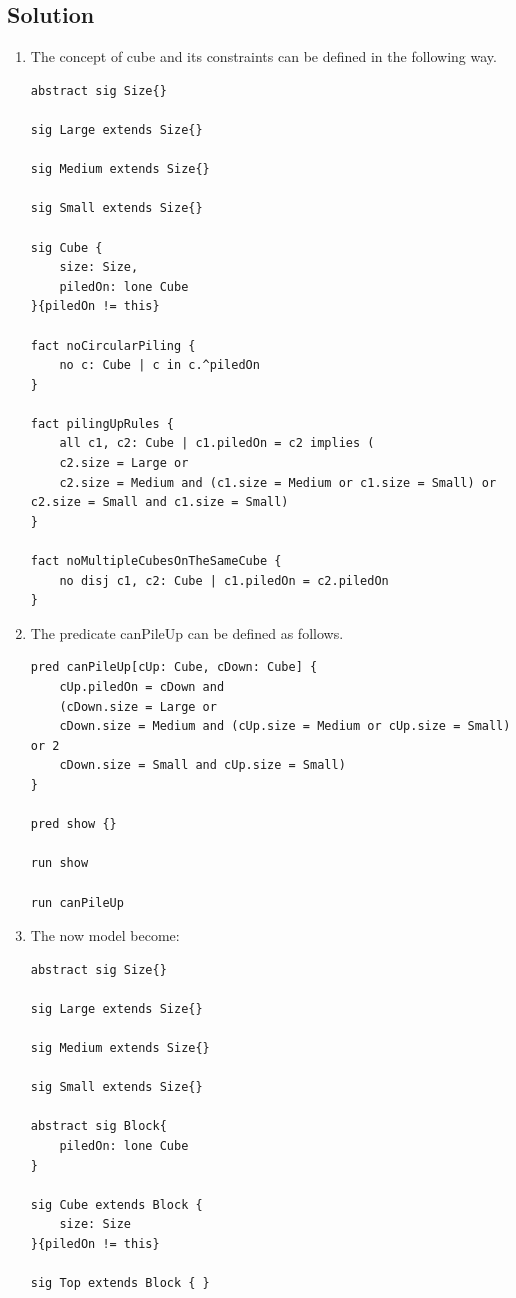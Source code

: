 \documentclass[12pt, a4paper]{report}
\newtheorem[style=M,bodystyle=\normalfont]{theorem}{Theorem}
\newtheorem[style=M,bodystyle=\normalfont]{corollary}{Corollary}
\newtheorem[style=M,bodystyle=\normalfont]{lemma}{Lemma}
\newtheorem[style=M,bodystyle=\normalfont]{definition}{Definition}
\begin{document}
    \subsection*{Solution}
    \begin{enumerate}
        \item The concept of cube and its constraints can be defined in the following way. 
            \begin{lstlisting}[language=alloy]
abstract sig Size{}

sig Large extends Size{} 

sig Medium extends Size{} 

sig Small extends Size{}

sig Cube {
    size: Size,
    piledOn: lone Cube
}{piledOn != this}

fact noCircularPiling {
    no c: Cube | c in c.^piledOn
}

fact pilingUpRules {
    all c1, c2: Cube | c1.piledOn = c2 implies (
    c2.size = Large or
    c2.size = Medium and (c1.size = Medium or c1.size = Small) or c2.size = Small and c1.size = Small)
}

fact noMultipleCubesOnTheSameCube {
    no disj c1, c2: Cube | c1.piledOn = c2.piledOn
}
            \end{lstlisting}
        \item The predicate canPileUp can be defined as follows. 
            \begin{lstlisting}[language=alloy]
pred canPileUp[cUp: Cube, cDown: Cube] {
    cUp.piledOn = cDown and
    (cDown.size = Large or
    cDown.size = Medium and (cUp.size = Medium or cUp.size = Small) or 2
    cDown.size = Small and cUp.size = Small) 
}

pred show {} 

run show

run canPileUp
            \end{lstlisting}
        \item The now model become: 
            \begin{lstlisting}[language=alloy]
abstract sig Size{}

sig Large extends Size{} 

sig Medium extends Size{} 

sig Small extends Size{}

abstract sig Block{ 
    piledOn: lone Cube
}

sig Cube extends Block { 
    size: Size
}{piledOn != this}

sig Top extends Block { }


\end{lstlisting}
\end{enumerate}
\end{document}
